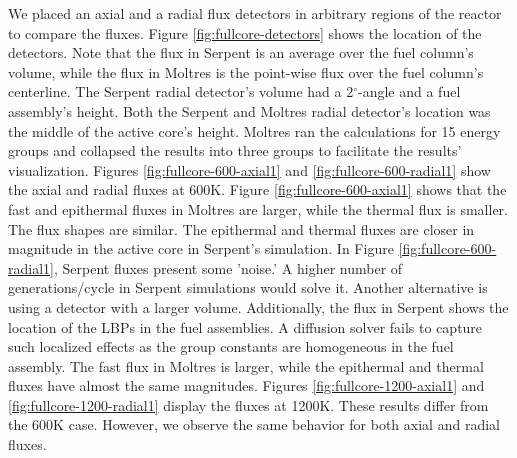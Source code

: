 We placed an axial and a radial flux detectors in arbitrary regions of the reactor to compare the fluxes.
Figure \ref{fig:fullcore-detectors} shows the location of the detectors.
Note that the flux in Serpent is an average over the fuel column's volume, while the flux in Moltres is the point-wise flux over the fuel column's centerline.
The Serpent radial detector's volume had a 2$^{\circ}$-angle and a fuel assembly's height.
Both the Serpent and Moltres radial detector's location was the middle of the active core's height.
Moltres ran the calculations for 15 energy groups and collapsed the results into three groups to facilitate the results' visualization.
Figures \ref{fig:fullcore-600-axial1} and \ref{fig:fullcore-600-radial1} show the axial and radial fluxes at 600K.
Figure \ref{fig:fullcore-600-axial1} shows that the fast and epithermal fluxes in Moltres are larger, while the thermal flux is smaller.
The flux shapes are similar.
The epithermal and thermal fluxes are closer in magnitude in the active core in Serpent's simulation.
In Figure \ref{fig:fullcore-600-radial1}, Serpent fluxes present some 'noise.'
A higher number of generations/cycle in Serpent simulations would solve it.
Another alternative is using a detector with a larger volume.
Additionally, the flux in Serpent shows the location of the LBPs in the fuel assemblies.
A diffusion solver fails to capture such localized effects as the group constants are homogeneous in the fuel assembly.
The fast flux in Moltres is larger, while the epithermal and thermal fluxes have almost the same magnitudes.
Figures \ref{fig:fullcore-1200-axial1} and \ref{fig:fullcore-1200-radial1} display the fluxes at 1200K.
These results differ from the 600K case.
However, we observe the same behavior for both axial and radial fluxes.

